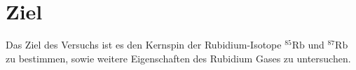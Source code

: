 \section{Ziel}
\label{sec:ziel}

Das Ziel des Versuchs ist es den Kernspin der Rubidium-Isotope $^{85}\text{Rb}$ und $^{87}\text{Rb}$ zu bestimmen, sowie weitere Eigenschaften des Rubidium Gases zu untersuchen.